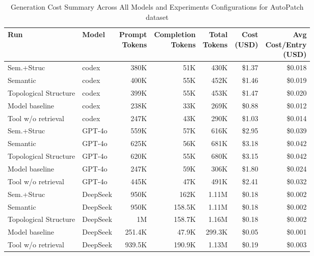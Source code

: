 \begin{table}[H]
  \centering
  \caption{Generation Cost Summary Across All Models and Experiments Configurations for AutoPatch dataset}
  \label{tab:generation_cost_summary_condensed}
  \begin{tabular}{llrrrrr}
    \toprule
Run & Model & \makecell{Prompt\\Tokens} & \makecell{Completion\\Tokens} & \makecell{Total\\Tokens} & \makecell{Cost\\(USD)} & \makecell{Avg\\Cost/Entry\\(USD)} \\
    \midrule
    Sem.+Struc & codex & 380K & 51K & 430K & \$1.37 & \$0.018 \\
    Semantic & codex & 400K & 55K & 452K & \$1.46 & \$0.019 \\
    Topological Structure & codex & 399K & 55K & 453K & \$1.47 & \$0.020 \\
    Model baseline & codex & 238K & 33K & 269K & \$0.88 & \$0.012 \\
    Tool w/o retrieval & codex & 247K & 43K & 290K & \$1.03 & \$0.014 \\
    \midrule
    Sem.+Struc & GPT-4o & 559K & 57K & 616K & \$2.95 & \$0.039 \\
    Semantic & GPT-4o & 625K & 56K & 681K & \$3.18 & \$0.042 \\
    Topological Structure & GPT-4o & 620K & 55K & 680K & \$3.15 & \$0.042 \\
    Model baseline & GPT-4o & 247K & 59K & 306K & \$1.80 & \$0.024 \\
    Tool w/o retrieval & GPT-4o & 445K & 47K & 491K & \$2.41 & \$0.032 \\
    \midrule
    Sem.+Struc & DeepSeek & 950K & 162K & 1.11M & \$0.18 & \$0.002 \\
    Semantic & DeepSeek &  950K & 158.5K & 1.11M & \$0.18 & \$0.002 \\
    Topological Structure & DeepSeek &  1M & 158.7K & 1.16M & \$0.18 & \$0.002 \\
    Model baseline & DeepSeek & 251.4K & 47.9K & 299.3K & \$0.05 & \$0.001 \\
    Tool w/o retrieval & DeepSeek & 939.5K & 190.9K & 1.13M & \$0.19 & \$0.003 \\
    \bottomrule
  \end{tabular}
\end{table}



